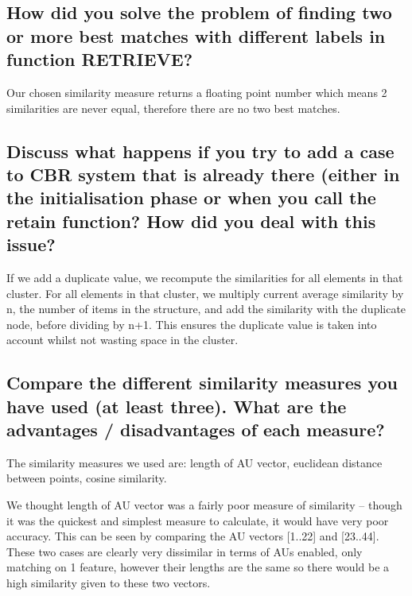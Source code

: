\documentclass[11pt]{article}
\begin{document}
\begin{itemize}
\begin{itemize}
\subsection{How did you solve the problem of finding two or more best matches with different labels in function RETRIEVE?}

Our chosen similarity measure returns a floating point number which means 2 similarities are 
never equal, therefore there are no two best matches. 


\subsection{Discuss what happens if you try to add a case to CBR system that is already there (either in the initialisation phase or when you call the retain function? How did you deal with this issue?}

If we add a duplicate value, we recompute the similarities for all elements in that cluster.
For all elements in that cluster, we multiply current average similarity by n, 
the number of items in the structure, and add
the similarity with the duplicate node, before dividing by n+1. This ensures the duplicate
value is taken into account whilst not wasting space in the cluster.


\subsection{Compare the different similarity measures you have used (at least three). What are the advantages / disadvantages of each measure?}

The similarity measures we used are: length of AU vector, euclidean distance between points, 
cosine similarity.

We thought length of AU vector was a fairly poor measure of similarity -- though it was the
quickest and simplest measure to calculate, it would have very poor accuracy. This can be seen
by comparing the AU vectors [1..22] and [23..44]. These two cases are clearly very
dissimilar in terms of AUs enabled, only matching on 1 feature, however their lengths are
the same so there would be a high similarity given to these two vectors.


\end{itemize}
\end{itemize}
\end{document}
